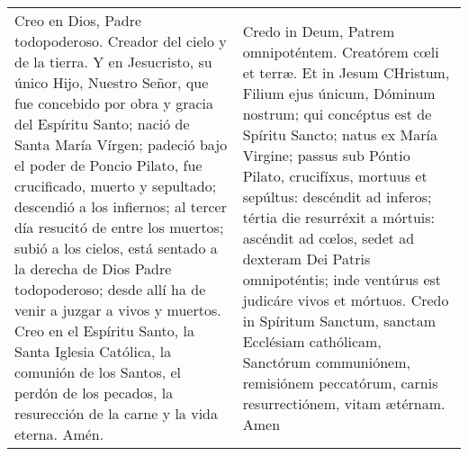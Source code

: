 \documentclass[./devocionario.tex]{subfiles}
\begin{document}
    \begin{longtable} { p{} p{} }
        Creo en Dios, Padre todopoderoso. Creador del cielo y de la tierra. Y en Jesucristo, su único Hijo, Nuestro Señor, 
        que fue concebido por obra y gracia del Espíritu Santo; nació de Santa María Vírgen; padeció bajo el poder de Poncio Pilato, 
        fue crucificado, muerto y sepultado; descendió a los infiernos; al tercer día resucitó de entre los muertos; subió a los cielos, 
        está sentado a la derecha de Dios Padre todopoderoso; desde allí ha de venir a juzgar a vivos y muertos. 
        Creo en el Espíritu Santo, la Santa Iglesia Católica, la comunión de los Santos, el perdón de los pecados, 
        la resurección de la carne y la vida eterna. Amén. &
        Credo in Deum, Patrem omnipoténtem. Creatórem cœli et terræ. Et in Jesum CHristum, Filium ejus únicum, Dóminum nostrum; 
        qui concéptus est de Spíritu Sancto; natus ex María Virgine; passus sub Póntio Pilato, crucifíxus, mortuus et sepúltus: 
        descéndit ad inferos; tértia die resurréxit a mórtuis: ascéndit ad cœlos, sedet ad dexteram Dei Patris omnipoténtis; 
        inde ventúrus est judicáre vivos et mórtuos. Credo in Spíritum Sanctum, sanctam Ecclésiam cathólicam, Sanctórum communiónem, 
        remisiónem peccatórum, carnis resurrectiónem, vitam ætérnam. Amen
    \end{longtable}
\end{document}
